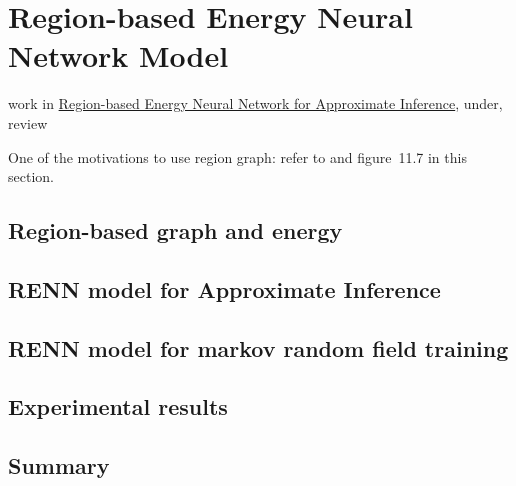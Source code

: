\chapter{Region-based Energy Neural Network Model}
work in \href{https://github.com/FirstHandScientist/paper_renn}{Region-based Energy Neural Network for Approximate Inference}, under, review

One of the motivations to use region graph: refer to \cite[section~11.3.5.3]{koller2009pgm} and figure~11.7 in this section.

\section{Region-based graph and energy}

\section{RENN model for Approximate Inference}

\section{RENN model for markov random field training}

\section{Experimental results}

\section{Summary}
